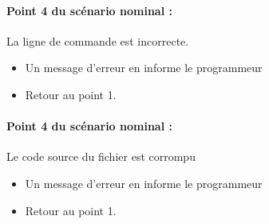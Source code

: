 	\paragraph{Point 4 du scénario nominal :} La ligne de commande est incorrecte.
	\begin{itemize}
		\item Un message d'erreur en informe le programmeur
		\item Retour au point 1.
	\end{itemize}

	\paragraph{Point 4 du scénario nominal :} Le code source du fichier est corrompu
	\begin{itemize}
		\item Un message d'erreur en informe le programmeur
		\item Retour au point 1.
	\end{itemize}
